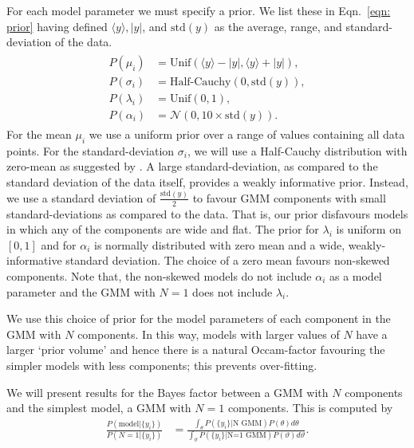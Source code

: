 \documentclass[../full_thesis/full_thesis.tex]{subfiles}
\begin{document}
\begin{subappendices}
\newcommand{\yave}{\langle y \rangle}
\newcommand{\yran}{| y |}
\newcommand{\ystd}{\textrm{std}(y)}
For each model parameter we must specify a prior. We list these in
Eqn.~\eqref{eqn: prior} having defined $\yave, \yran$, and $\ystd$ as the average,
range, and standard-deviation of the data.
\begin{align}
\begin{split}
P(\mu_i) & = \textrm{Unif}(\yave - \yran, \yave + \yran), \\
P(\sigma_i)  &= \textrm{Half-Cauchy}\left(0, \ystd\right), \\
P(\lambda_i)  &= \textrm{Unif}(0, 1), \\
P(\alpha_i)  &= \mathcal{N}(0, 10\times\ystd).
\end{split}
\label{eqn: prior}
\end{align}
For the mean $\mu_i$ we use a uniform prior over a range of values containing
all data points.  For the standard-deviation $\sigma_i$, we will use a
Half-Cauchy distribution with zero-mean as suggested by
\citet{gelman2006prior}. A large standard-deviation, as compared to the
standard deviation of the data itself, provides a weakly informative prior.
Instead, we use a standard deviation of $\frac{\ystd}{2}$ to favour GMM
components with small standard-deviations as compared to the data. That is, our
prior disfavours models in which any of the components are wide and flat. The
prior for $\lambda_i$ is uniform on $[0, 1]$ and for $\alpha_i$ is normally
distributed with zero mean and a wide, weakly-informative standard deviation.
The choice of a zero mean favours non-skewed components. Note that, the
non-skewed models do not include $\alpha_i$ as a model parameter and the GMM
with $N=1$ does not include $\lambda_i$.

We use this choice of prior for the model parameters of each component in the
GMM with $N$ components.  In this way, models with larger values of $N$ have a
larger `prior volume' and hence there is a natural Occam-factor favouring the
simpler models with less components; this prevents over-fitting.

We will present results for the Bayes factor between a GMM with $N$ components
and the simplest model, a GMM with $N=1$  components. This is computed by
\begin{align}
\frac{P(\textrm{model}| \{y_i\})}{P(N=1|\{y_i\})} & =
\frac{\int_{\theta}P(\{y_i\}| \textrm{N GMM}) P(\theta) d\theta}
{\int_{\vartheta}P(\{y_i\} | \textrm{N=1 GMM}) P(\vartheta) d\vartheta}.
\end{align}


\end{subappendices}
\end{document}

